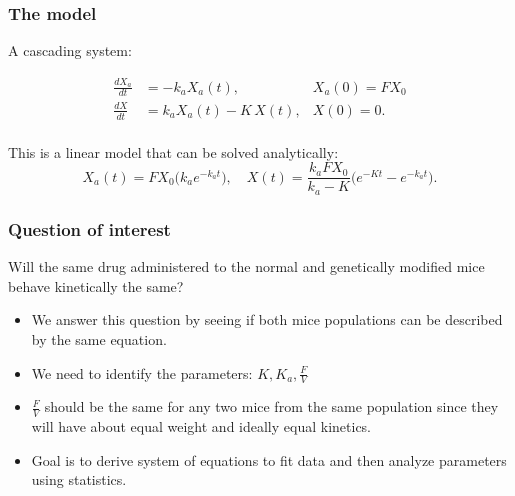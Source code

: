 \documentclass[t]{beamer}
\begin{document}
\begin{frame}
\frametitle{The model}
A cascading system:
\begin{center}
\end{center}

  \begin{align*}
    \frac{dX_a}{dt} &= -k_a X_a(t), &X_a(0) = FX_0\\
    \frac{dX}{dt}   &= k_a X_a(t) - K\,X(t), &X(0) = 0.\\
  \end{align*}
\pause

This is a linear model that can be solved analytically:
$$
X_a(t) = FX_0 \big( k_ae^{-k_at} \big), \quad
X(t) = \frac{k_a F X_0}{k_a - K}\big( e^{-Kt} - e^{-k_a t}\big).
$$

\end{frame}
\begin{frame}
\frametitle{Question of interest}
\alert{Will the same drug administered to the normal and genetically modified mice behave kinetically the same? }
\begin{itemize}
\item We answer this question by seeing if both mice populations can be described by the same equation. 
\item We need to identify the parameters: $K, K_{a}, \frac{F}{V}$
\item $\frac{F}{V}$ should be the same for any two mice from the same population since they will have about equal weight and ideally equal kinetics. 
\item Goal is to derive system of equations to fit data and then analyze parameters using statistics.  
\end{itemize}
\end{frame}
\end{document}
